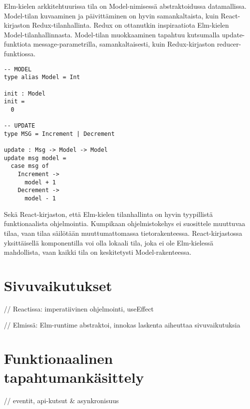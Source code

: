 Elm-kielen arkkitehtuurissa tila on Model-nimisessä abstraktoidussa datamallissa. Model-tilan kuvaaminen ja
päivittäminen on hyvin samankaltaista, kuin React-kirjaston Redux-tilanhallinta. Redux on ottanutkin inspiraatiota
Elm-kielen Model-tilanhallinnasta. Model-tilan muokkaaminen tapahtuu kutsumalla update-funktiota message-parametrilla,
samankaltaisesti, kuin Redux-kirjaston reducer-funktiossa. \cite{elmlang}
\begin{verbatim}
-- MODEL
type alias Model = Int

init : Model
init =
  0

-- UPDATE
type MSG = Increment | Decrement

update : Msg -> Model -> Model
update msg model =
  case msg of
    Increment ->
      model + 1
    Decrement ->
      model - 1
\end{verbatim}

Sekä React-kirjaston, että Elm-kielen tilanhallinta on hyvin tyypillistä funktionaalista ohjelmointia. Kumpikaan
ohjelmistokehys ei suosittele muuttuvaa tilaa, vaan tilaa säilötään muuttumattomassa tietorakenteessa. React-kirjastossa
yksittäisellä komponentilla voi olla lokaali tila, joka ei ole Elm-kielessä mahdollista, vaan kaikki tila on
keskitetysti Model-rakenteessa.

\section{Sivuvaikutukset}

// Reactissa: imperatiivinen ohjelmointi, useEffect

// Elmissä: Elm-runtime abstraktoi, innokas laskenta aiheuttaa sivuvaikutuksia

\section{Funktionaalinen tapahtumankäsittely}

// eventit, api-kutsut \& asynkronisuus
